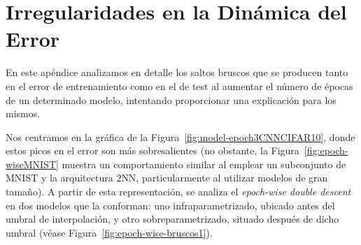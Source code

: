 
\chapter{Irregularidades en la Dinámica del Error}\label{ap:apendiceD}

En este apéndice analizamos en detalle los saltos bruscos que se producen tanto en el error de entrenamiento como en el de test al aumentar el número de épocas de un determinado modelo, intentando proporcionar una explicación para los mismos.

Nos centramos en la gráfica de la Figura~\ref{fig:model-epoch3CNNCIFAR10}, donde estos picos en el error son más sobresalientes (no obstante, la Figura~\ref{fig:epoch-wiseMNIST} muestra un comportamiento similar al emplear un subconjunto de MNIST y la arquitectura $2$NN, particularmente al utilizar modelos de gran tamaño). A partir de esta representación, se analiza el \textit{epoch-wise double descent} en dos modelos que la conforman: uno infraparametrizado, ubicado antes del umbral de interpolación, y otro sobreparametrizado, situado después de dicho umbral (véase Figura~\ref{fig:epoch-wise-bruscos1}).

